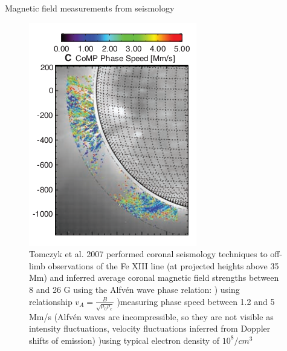 \documentclass{beamer}
\begin{document}
\begin{frame}{Magnetic field measurements from seismology}
\begin{figure}[H]
 \begin{minipage}[c]{0.5\textwidth}
    \includegraphics[scale=0.5]{ts4.png}
  \end{minipage}\hfill
  \begin{minipage}[c]{0.5\textwidth}
    \caption{
Tomczyk et al. 2007 performed coronal seismology techniques  to off-limb observations of
the Fe XIII line (at projected heights above 35 Mm) and
inferred average coronal magnetic field strengths between 8
and 26 G using the Alfv\'en wave phase relation:
) using relationship $v_A=\frac{B}{\sqrt{\mu_0 \rho_c}}$
)measuring phase speed between 1.2 and 5 Mm/s
(Alfv\'en waves are incompressible, so they
are not visible as intensity fluctuations,
velocity fluctuations
inferred from Doppler shifts of emission)
)using typical electron density of $10^8 /cm^3$
    } 
  \end{minipage}
\end{figure}


\end{frame}
\end{document}
